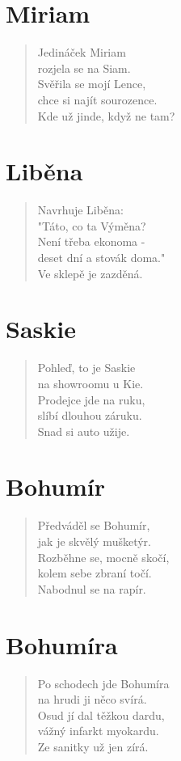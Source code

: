 \section*{Miriam}
\begin{verse}
Jedináček Miriam\\
rozjela se na Siam.\\
Svěřila se mojí Lence,\\
chce si najít sourozence.\\
Kde už jinde, když ne tam?
\end{verse}

\section*{Liběna}
\begin{verse}
Navrhuje Liběna:\\
"Táto, co ta Výměna?\\
Není třeba ekonoma -\\
deset dní a stovák doma."\\
Ve sklepě je zazděná.
\end{verse}

\section*{Saskie}
\begin{verse}
Pohleď, to je Saskie\\
na showroomu u Kie.\\
Prodejce jde na ruku,\\
slíbí dlouhou záruku.\\
Snad si auto užije.
\end{verse}

\section*{Bohumír}
\begin{verse}
Předváděl se Bohumír,\\
jak je skvělý mušketýr.\\
Rozběhne se, mocně skočí,\\
kolem sebe zbraní točí.\\
Nabodnul se na rapír.
\end{verse}

\section*{Bohumíra}
\begin{verse}
Po schodech jde Bohumíra\\
na hrudi ji něco svírá.\\
Osud jí dal těžkou dardu,\\
vážný infarkt myokardu.\\
Ze sanitky už jen zírá.
\end{verse}

